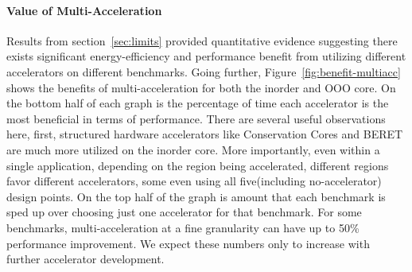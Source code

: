 \paragraph{Value of Multi-Acceleration}  
Results from section~\ref{sec:limits} provided quantitative evidence
suggesting there exists significant energy-efficiency and performance 
benefit from utilizing different accelerators on different benchmarks.
Going further, Figure~\ref{fig:benefit-multiacc} shows the benefits of
multi-acceleration for both the inorder and OOO core.  On the bottom half of
each graph is the percentage of time each accelerator is the most beneficial
in terms of performance.  There are several useful observations here, first,
structured hardware accelerators like Conservation Cores and BERET are much
more utilized on the inorder core.  More importantly, even within a single
application, depending on the region being accelerated, different regions
favor different accelerators, some even using all five(including
no-accelerator) design points.  On the top half of the graph is amount that
each benchmark is sped up over choosing just one accelerator for that
benchmark.  For some benchmarks, multi-acceleration at a fine granularity can
have up to 50\% performance improvement.  We expect these numbers only
to increase with further accelerator development.

